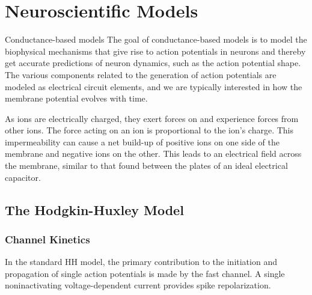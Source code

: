 



\chapter{Neuroscientific Models}\label{chap:compneuro}

Conductance-based models
The goal of conductance-based models is to model the biophysical mechanisms that give rise to action potentials in neurons and thereby get accurate predictions of neuron dynamics, such as the action potential shape. The various components related to the generation of action potentials are modeled as electrical circuit elements, and we are typically interested in how the membrane potential evolves with time.

As ions are electrically charged, they exert forces on and experience forces from other ions. The force acting on an ion is proportional to the ion's charge. This impermeability can cause a net build-up of positive ions on one side of the membrane and negative ions on the other. This leads to an electrical field across the membrane, similar to that found between the plates of an ideal electrical capacitor.

\section{The Hodgkin-Huxley Model}

\subsection{Channel Kinetics}

In the standard HH model, the primary contribution to the initiation and propagation of single action potentials is made by the fast \Na channel. A single noninactivating voltage-dependent \K current provides spike repolarization. 

